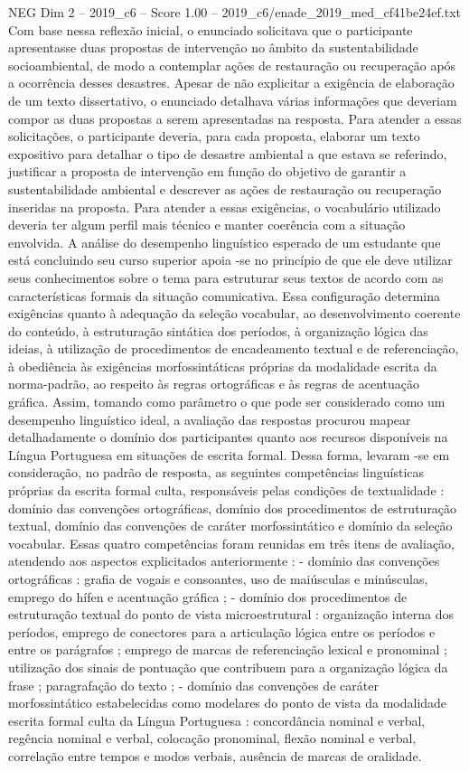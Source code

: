 \begin{textsample}{NEG Dim 2 – 2019\_c6 – Score 1.00 – 2019\_c6/enade\_2019\_med\_cf41be24ef.txt}
Com base nessa reflexão inicial, o enunciado solicitava que o participante apresentasse duas propostas de intervenção no âmbito da sustentabilidade socioambiental, de modo a contemplar ações de restauração ou recuperação após a ocorrência desses desastres.
Apesar de não explicitar a exigência de elaboração de um texto dissertativo, o enunciado detalhava várias informações que deveriam compor as duas propostas a serem apresentadas na resposta.
Para atender a essas solicitações, o participante deveria, para cada proposta, elaborar um texto expositivo para detalhar o tipo de desastre ambiental a que estava se referindo, justificar a proposta de intervenção em função do objetivo de garantir a sustentabilidade ambiental e descrever as ações de restauração ou recuperação inseridas na proposta.
Para atender a essas exigências, o vocabulário utilizado deveria ter algum perfil mais técnico e manter coerência com a situação envolvida.
A análise do desempenho linguístico esperado de um estudante que está concluindo seu curso superior apoia -se no princípio de que ele deve utilizar seus conhecimentos sobre o tema para estruturar seus textos de acordo com as características formais da situação comunicativa.
Essa configuração determina exigências quanto à adequação da seleção vocabular, ao desenvolvimento coerente do conteúdo, à estruturação sintática dos períodos, à organização lógica das ideias, à utilização de procedimentos de encadeamento textual e de referenciação, à obediência às exigências morfossintáticas próprias da modalidade escrita da norma-padrão, ao respeito às regras ortográficas e às regras de acentuação gráfica.
Assim, tomando como parâmetro o que pode ser considerado como um desempenho linguístico ideal, a avaliação das respostas procurou mapear detalhadamente o domínio dos participantes quanto aos recursos disponíveis na Língua Portuguesa em situações de escrita formal.
Dessa forma, levaram -se em consideração, no padrão de resposta, as seguintes competências linguísticas próprias da escrita formal culta, responsáveis pelas condições de textualidade : domínio das convenções ortográficas, domínio dos procedimentos de estruturação textual, domínio das convenções de caráter morfossintático e domínio da seleção vocabular.
Essas quatro competências foram reunidas em três itens de avaliação, atendendo aos aspectos explicitados anteriormente : - domínio das convenções ortográficas : grafia de vogais e consoantes, uso de maiúsculas e minúsculas, emprego do hífen e acentuação gráfica ; - domínio dos procedimentos de estruturação textual do ponto de vista microestrutural : organização interna dos períodos, emprego de conectores para a articulação lógica entre os períodos e entre os parágrafos ; emprego de marcas de referenciação lexical e pronominal ; utilização dos sinais de pontuação que contribuem para a organização lógica da frase ; paragrafação do texto ; - domínio das convenções de caráter morfossintático estabelecidas como modelares do ponto de vista da modalidade escrita formal culta da Língua Portuguesa : concordância nominal e verbal, regência nominal e verbal, colocação pronominal, flexão nominal e verbal, correlação entre tempos e modos verbais, ausência de marcas de oralidade.

\end{textsample}
